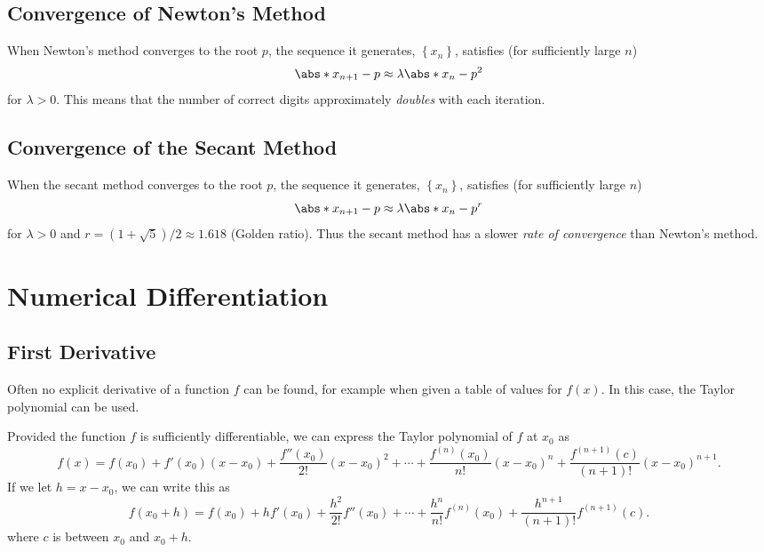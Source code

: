 \documentclass{article}
\begin{document}
\subsection{Convergence of Newton's Method}
When Newton's method converges to the root \(p\), the sequence it generates, \(\left\{ x_n \right\}\), satisfies (for sufficiently large \(n\))
\begin{equation*}
    \abs*{x_{n + 1} - p} \approx \lambda \abs*{x_n - p}^2
\end{equation*}
for \(\lambda > 0\). This means that the number of correct digits approximately \textit{doubles} with each iteration.
\subsection{Convergence of the Secant Method}
When the secant method converges to the root \(p\), the sequence it generates, \(\left\{ x_n \right\}\), satisfies (for sufficiently large \(n\))
\begin{equation*}
    \abs*{x_{n + 1} - p} \approx \lambda \abs*{x_n - p}^r
\end{equation*}
for \(\lambda > 0\) and \(r = \left( 1 + \sqrt{5} \right)/2 \approx 1.618\) (Golden ratio).
Thus the secant method has a slower \textit{rate of convergence} than Newton's method.
\section{Numerical Differentiation}
\subsection{First Derivative}
Often no explicit derivative of a function \(f\) can be found, for example when given a table of
values for \(f\left( x \right)\). In this case, the Taylor polynomial can be used.

Provided the function \(f\) is sufficiently differentiable, we can express the Taylor polynomial of \(f\) at \(x_0\) as
\begin{equation*}
    f\left( x \right) = f\left( x_0 \right) + f'\left( x_0 \right) \left( x - x_0 \right) + \frac{f''\left( x_0 \right)}{2!} \left( x - x_0 \right)^2 + \cdots + \frac{f^{\left( n \right)}\left( x_0 \right)}{n!} \left( x - x_0 \right)^n + \frac{f^{\left( n + 1 \right)}\left( c \right)}{\left( n + 1 \right)!} \left( x - x_0 \right)^{n + 1}.
\end{equation*}
If we let \(h = x - x_0\), we can write this as
\begin{equation*}
    f\left( x_0 + h \right) = f\left( x_0 \right) + h f'\left( x_0 \right) + \frac{h^2}{2!} f''\left( x_0 \right) + \cdots + \frac{h^n}{n!} f^{\left( n \right)}\left( x_0 \right) + \frac{h^{n + 1}}{\left( n + 1 \right)!} f^{\left( n + 1 \right)}\left( c \right).
\end{equation*}
where \(c\) is between \(x_0\) and \(x_0 + h\).
\end{document}
